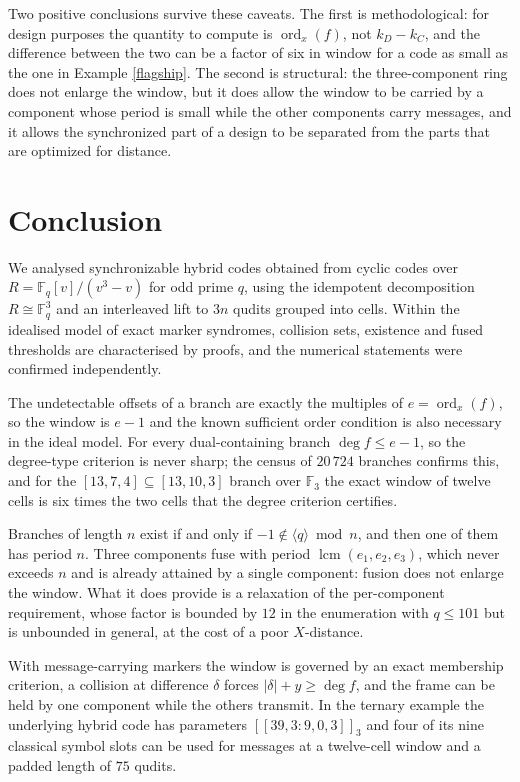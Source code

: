 \documentclass[11pt,reqno]{amsart}
\theoremstyle{definition}
\theoremstyle{remark}
\newcommand{\F}{\mathbb{F}}
\newcommand{\ord}{\operatorname{ord}}
\newcommand{\lcm}{\operatorname{lcm}}
\newcommand{\gen}[1]{\langle #1\rangle}
\begin{document}
Two positive conclusions survive these caveats. The first is methodological: for design purposes the quantity to compute is $\ord_x(f)$, not $k_D-k_C$, and the difference between the two can be a factor of six in window for a code as small as the one in Example \ref{flagship}. The second is structural: the three-component ring does not enlarge the window, but it does allow the window to be carried by a component whose period is small while the other components carry messages, and it allows the synchronized part of a design to be separated from the parts that are optimized for distance.


\section{Conclusion}\label{sec:conclusion}

We analysed synchronizable hybrid codes obtained from cyclic codes over $R=\F_q[v]/(v^3-v)$ for odd prime $q$, using the idempotent decomposition $R\cong\F_q^3$ and an interleaved lift to $3n$ qudits grouped into cells. Within the idealised model of exact marker syndromes, collision sets, existence and fused thresholds are characterised by proofs, and the numerical statements were confirmed independently.


The undetectable offsets of a branch are exactly the multiples of $e=\ord_x(f)$, so the window is $e-1$ and the known sufficient order condition is also necessary in the ideal model. For every dual-containing branch $\deg f\le e-1$, so the degree-type criterion is never sharp; the census of $20\,724$ branches confirms this, and for the $[13,7,4]\subseteq[13,10,3]$ branch over $\F_3$ the exact window of twelve cells is six times the two cells that the degree criterion certifies.


Branches of length $n$ exist if and only if $-1\notin\gen{q}\bmod n$, and then one of them has period $n$. Three components fuse with period $\lcm(e_1,e_2,e_3)$, which never exceeds $n$ and is already attained by a single component: fusion does not enlarge the window. What it does provide is a relaxation of the per-component requirement, whose factor is bounded by $12$ in the enumeration with $q\le101$ but is unbounded in general, at the cost of a poor $X$-distance.


With message-carrying markers the window is governed by an exact membership criterion, a collision at difference $\delta$ forces $|\delta|+y\ge\deg f$, and the frame can be held by one component while the others transmit. In the ternary example the underlying hybrid code has parameters $[[39,3:9,0,3]]_3$ and four of its nine classical symbol slots can be used for messages at a twelve-cell window and a padded length of $75$ qudits.
\end{document}
